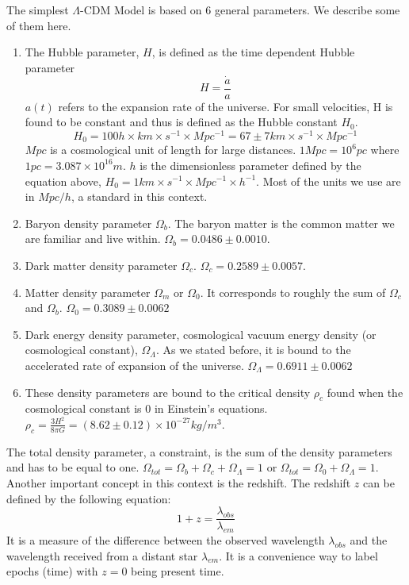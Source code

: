 \documentclass[12pt]{article}
\begin{document}
\begin{par}
The simplest $\Lambda$-CDM Model is based on 6 general parameters. We describe some of them here.\\
\begin{enumerate}
\item The Hubble parameter, $H$, is defined as the time
 dependent Hubble parameter 
\[
H = \frac{\dot{a}}{a}
\]
$a(t)$ refers to the expansion rate of the universe. For
 small velocities, H is found to be constant and thus is
  defined as the Hubble constant $H_0$. 
\[
H_0 = 100 h \times km \times s^{-1} \times Mpc^{-1} = 67 \pm 7 km \times s^{-1} \times Mpc^{-1}
\]
$Mpc$ is a cosmological unit of length for large
 distances. $1 Mpc = 10^6 pc$ where $1 pc = 3.087 \times
  10^{16} m$. $h$ is the dimensionless parameter defined
   by the equation above, $H_0 = 1 km \times s^{-1} \times Mpc^{-1} \times
    h^{-1}$. Most of the units we use are in $Mpc/h$, a
     standard in this context.
\item Baryon density parameter $\Omega_b$. The baryon matter is the common matter we are familiar and live within. $\Omega_b = 0.0486 \pm 0.0010$.

\item Dark matter density parameter $\Omega_c$. $\Omega_c = 0.2589 \pm 0.0057$.

\item Matter density parameter $\Omega_m$ or $\Omega_0$.
 It corresponds to roughly the sum of $\Omega_c$ and
  $\Omega_b$. $\Omega_0 = 0.3089 \pm 0.0062$

\item Dark energy density parameter, cosmological vacuum energy density (or cosmological constant), $\Omega_{\Lambda}$. As we stated before, it is bound to the accelerated rate of expansion of the universe. $\Omega_{\Lambda} = 0.6911 \pm 0.0062$

\item These density parameters are bound to the critical density $\rho_c$ found when the cosmological constant is 0 in Einstein's equations. $\rho_c = \frac{3H^2}{8 \pi G} = (8.62 \pm 0.12) \times 10^{−27} kg/m^3$.

\end{enumerate}
The total density parameter, a constraint, is the sum of
 the density parameters and has to be equal to one. $\Omega_{tot} = \Omega_b + \Omega_c + \Omega_{\Lambda} =1$ or $\Omega_{tot} = \Omega_0 + \Omega_{\Lambda} =1$.\\

Another important concept in this context is the redshift. The redshift $z$ can be defined by the following equation\cite{peebles_cosmological_2003}: 
\[
1 + z = \frac{\lambda_{obs}}{\lambda_{em}}
\] 
It is a measure of the difference between the observed
 wavelength $\lambda_{obs}$ and the wavelength received
  from a distant star $\lambda_{em}$. It is a convenience
   way to label epochs (time) with $z=0$ being present
    time.
\end{par}
\end{document}
